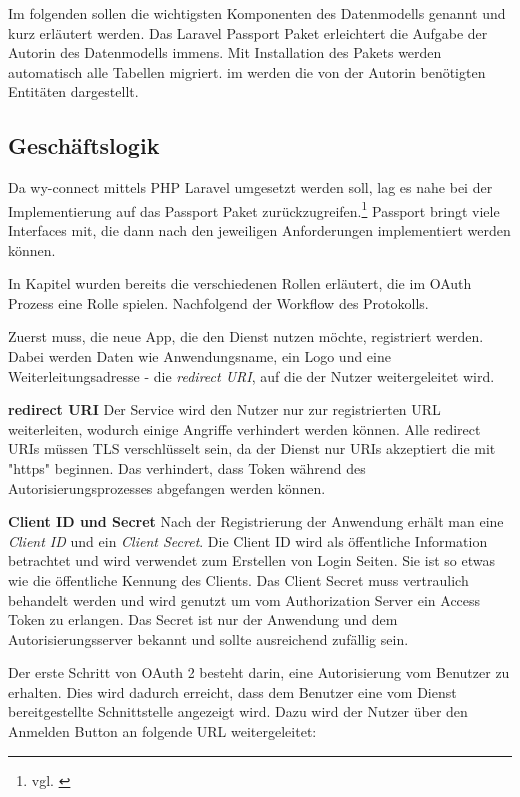 Im folgenden sollen die wichtigsten Komponenten des Datenmodells genannt und kurz erläutert werden. 
Das Laravel Passport Paket erleichtert die Aufgabe der Autorin des Datenmodells immens. Mit Installation des Pakets werden automatisch alle Tabellen migriert. im  werden die von der Autorin benötigten Entitäten dargestellt. 


\subsection{Geschäftslogik}
\label{sec:Geschaeftslogik}

Da wy-connect mittels \acs{PHP} Laravel umgesetzt werden soll, lag es nahe bei der Implementierung auf das Passport Paket zurückzugreifen.\footnote{vgl. \cite{Passport}}
Passport bringt viele Interfaces mit, die dann nach den jeweiligen Anforderungen implementiert werden können. 

In Kapitel  wurden bereits die verschiedenen Rollen erläutert, die im OAuth Prozess eine Rolle spielen. Nachfolgend der Workflow des Protokolls.

Zuerst muss, die neue App, die den Dienst nutzen möchte, registriert werden. Dabei werden Daten wie Anwendungsname, ein Logo und eine Weiterleitungsadresse - die \textit{redirect URI}, auf die der Nutzer weitergeleitet wird.

\textbf{redirect URI}
Der Service wird den Nutzer nur zur registrierten URL weiterleiten, wodurch einige Angriffe verhindert werden können. Alle redirect URIs müssen TLS verschlüsselt sein, da der Dienst nur URIs akzeptiert die mit "https" beginnen. Das verhindert, dass Token während des Autorisierungsprozesses abgefangen werden können. 

\textbf{Client ID und Secret}
Nach der Registrierung der Anwendung erhält man eine \textit{Client ID} und ein \textit{Client Secret}. Die Client ID wird als öffentliche Information betrachtet und wird verwendet zum Erstellen von Login Seiten. Sie ist so etwas wie die öffentliche Kennung des Clients. 
Das Client Secret muss vertraulich behandelt werden und wird genutzt um vom Authorization Server ein Access Token zu erlangen. Das Secret ist nur der Anwendung und dem Autorisierungsserver bekannt und sollte ausreichend zufällig sein. 

Der erste Schritt von OAuth 2 besteht darin, eine Autorisierung vom Benutzer zu erhalten. Dies wird dadurch erreicht, dass dem Benutzer eine vom Dienst bereitgestellte Schnittstelle angezeigt wird. Dazu wird der Nutzer über den Anmelden Button an folgende URL weitergeleitet:

